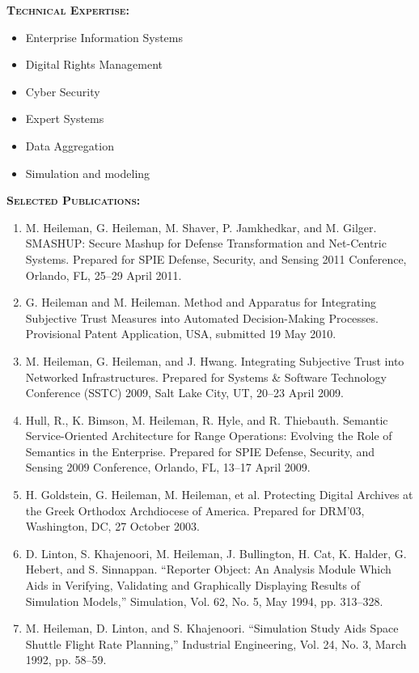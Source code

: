 \documentclass{sbir}
\begin{document}
\vspace{-18pt}
{\textcolor{black}{\makebox[6.5in]{\hrulefill}} 
\textbf{\textsc{Technical Expertise:}}
\vspace{-8pt}
\begin{multicols}{2}
 \begin{itemize}
  \item Enterprise Information Systems
  \item Digital Rights Management
  \item Cyber Security
  \item Expert Systems
  \item Data Aggregation
  \item Simulation and modeling	
 \end{itemize}
\end{multicols}
\vspace{-16pt}
\textbf{\textsc{Selected Publications:}}
\vspace{-8pt}
\begin{enumerate}
\item M. Heileman, G. Heileman, M. Shaver, P. Jamkhedkar, and M. Gilger. SMASHUP: Secure Mashup for Defense Transformation and Net-Centric Systems. Prepared for SPIE Defense, Security, and Sensing 2011 Conference, Orlando, FL, 25--29 April 2011.
\item G. Heileman and M. Heileman. Method and Apparatus for Integrating Subjective Trust Measures into Automated Decision-Making Processes. Provisional Patent Application, USA, submitted 19 May 2010.
\item M. Heileman, G. Heileman, and J. Hwang. Integrating Subjective Trust into Networked Infrastructures. Prepared for Systems \& Software Technology Conference (SSTC) 2009, Salt Lake City, UT, 20--23 April 2009.
\item Hull, R., K. Bimson, M. Heileman, R. Hyle, and R. Thiebauth. Semantic Service-Oriented Architecture for Range Operations: Evolving the Role of Semantics in the Enterprise. Prepared for SPIE Defense, Security, and Sensing 2009 Conference, Orlando, FL, 13--17 April 2009.
\item H. Goldstein, G. Heileman, M. Heileman, et al. Protecting Digital Archives at the Greek Orthodox Archdiocese of America. Prepared for DRM'03, Washington, DC, 27 October 2003.
\item D. Linton, S. Khajenoori, M. Heileman, J. Bullington, H. Cat, K. Halder, G. Hebert, and S. Sinnappan. ``Reporter Object: An Analysis Module Which Aids in Verifying, Validating and Graphically Displaying Results of Simulation Models,'' Simulation, Vol. 62, No. 5, May 1994, pp. 313--328.
\item M. Heileman, D. Linton, and S. Khajenoori. ``Simulation Study Aids Space Shuttle Flight Rate Planning,'' Industrial Engineering, Vol. 24, No. 3, March 1992, pp. 58--59.
\end{enumerate}

}
\end{document}
